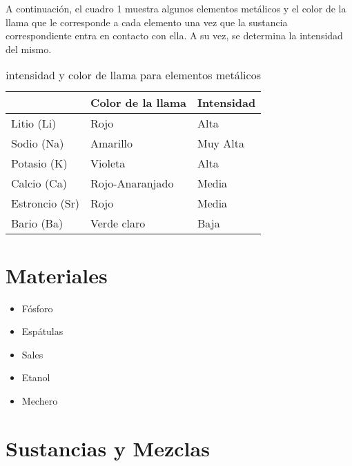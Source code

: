 \documentclass{article}
\begin{document}
A continuación, el cuadro 1 muestra algunos elementos metálicos y el color de la llama que le corresponde a cada elemento una vez que la sustancia correspondiente entra en contacto con ella. A su vez, se determina la intensidad del mismo. 

\begin{table}[H]
\centering
\begin{tabular}{|l|l|l|}
\hline
\rowcolor[HTML]{C0C0C0} 
\multicolumn{1}{|c|}{\cellcolor[HTML]{C0C0C0}Elemento Metálico} & \multicolumn{1}{c|}{\cellcolor[HTML]{C0C0C0}Color de la llama} & \multicolumn{1}{c|}{\cellcolor[HTML]{C0C0C0}Intensidad} \\ \hline
Litio (Li) & Rojo & Alta \\ \hline
Sodio (Na) & Amarillo & Muy Alta \\ \hline
Potasio (K) & Violeta & Alta \\ \hline
Calcio (Ca) & Rojo-Anaranjado & Media \\ \hline
Estroncio (Sr) & Rojo & Media \\ \hline
Bario (Ba) & Verde claro & Baja \\ \hline
\end{tabular}
\caption{intensidad y color de llama para elementos metálicos}
\label{table:elem}
\end{table}

\section{Materiales}

\begin{itemize}
    \item Fósforo
    \item Espátulas
    \item Sales
    \item Etanol
    \item Mechero
\end{itemize}

\section{Sustancias y Mezclas}
\end{document}
